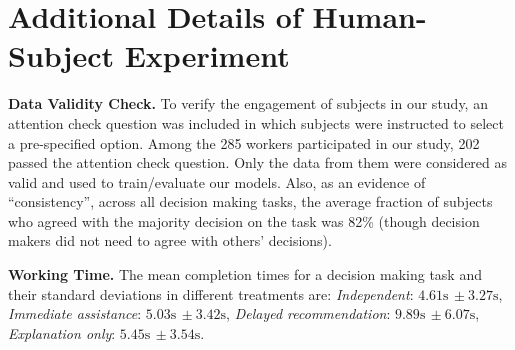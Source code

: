 \documentclass[letterpaper]{article} %
\begin{document}
\section{Additional Details of Human-Subject Experiment}
\noindent \textbf{Data Validity Check.} To verify the engagement of subjects in our study, an attention check question was included in which subjects were instructed to select a pre-specified option. Among the 285 workers participated in our study, 202 passed the attention check question. Only the data from them were considered as valid and used to train/evaluate our models. Also, as an evidence of ``consistency'', across all decision making tasks, the average fraction of subjects who agreed with the majority decision on the task was 82\% (though decision makers did not need to agree with others' decisions).

\noindent \textbf{Working Time.} The mean  completion times for a decision making task and their standard deviations in different treatments are: {\em Independent}: $4.61 \text{s} \, \pm 3.27 \text{s}$, {\em Immediate assistance}: $5.03 \text{s} \, \pm 3.42 \text{s}$, {\em Delayed recommendation}:  $9.89 \text{s} \, \pm 6.07 \text{s}$, {\em Explanation only}:   $5.45 \text{s} \, \pm 3.54 \text{s}$.

\begin{table}[t]

\centering
{}
\caption{Comparing  the performance of our method against an alternative that substitutes the distribution of decision model $q_{\phi}(\bm{w}_h)$ of our method  with a deterministic logistic regression model in the \emph{Delayed recommendation} scenario. NLL is adopted as the evaluation metric, with a lower NLL denoting superior performance.
}
\label{tab:ablation}
\end{table}
\end{document}
